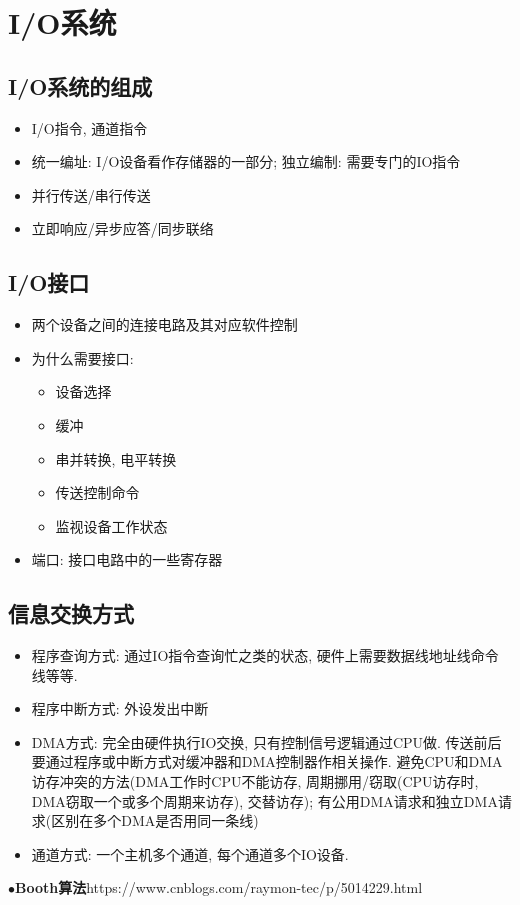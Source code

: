 \documentclass[UTF8]{article}
\newcommand{\keypoint}[2]{$\bullet$\textbf{#1}\quad#2\par}
\begin{document}
\section{I/O系统}
\subsection{I/O系统的组成}
\begin{itemize}
\item I/O指令, 通道指令
\item 统一编址: I/O设备看作存储器的一部分; 独立编制: 需要专门的IO指令
\item 并行传送/串行传送
\item 立即响应/异步应答/同步联络
\end{itemize}
\subsection{I/O接口}
\begin{itemize}
\item 两个设备之间的连接电路及其对应软件控制
\item 为什么需要接口: 
	\begin{itemize}
	\item 设备选择
	\item 缓冲
	\item 串并转换, 电平转换
	\item 传送控制命令
	\item 监视设备工作状态
	\end{itemize}
\item 端口: 接口电路中的一些寄存器
\end{itemize}
\subsection{信息交换方式}
\begin{itemize}
\item 程序查询方式: 通过IO指令查询忙之类的状态, 硬件上需要数据线地址线命令线等等.
\item 程序中断方式: 外设发出中断
\item DMA方式: 完全由硬件执行IO交换, 只有控制信号逻辑通过CPU做. 传送前后要通过程序或中断方式对缓冲器和DMA控制器作相关操作. 避免CPU和DMA访存冲突的方法(DMA工作时CPU不能访存, 周期挪用/窃取(CPU访存时, DMA窃取一个或多个周期来访存), 交替访存); 有公用DMA请求和独立DMA请求(区别在多个DMA是否用同一条线)
\item 通道方式: 一个主机多个通道, 每个通道多个IO设备. 
\end{itemize}




\newpage
\keypoint{Booth算法}{https://www.cnblogs.com/raymon-tec/p/5014229.html}
\end{document}
